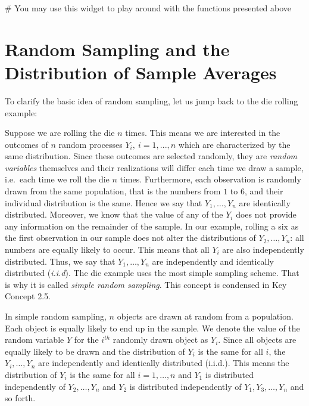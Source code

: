 \documentclass[]{book}
\theoremstyle{definition}
\theoremstyle{definition}
\theoremstyle{definition}
\theoremstyle{remark}
\begin{document}
 \# You may use this widget to play around with the functions presented
above

\section{Random Sampling and the Distribution of Sample
Averages}\label{RSATDOSA}

To clarify the basic idea of random sampling, let us jump back to the
die rolling example:

Suppose we are rolling the die \(n\) times. This means we are interested
in the outcomes of \(n\) random processes \(Y_i, \ i=1,...,n\) which are
characterized by the same distribution. Since these outcomes are
selected randomly, they are \emph{random variables} themselves and their
realizations will differ each time we draw a sample, i.e.~each time we
roll the die \(n\) times. Furthermore, each observation is randomly
drawn from the same population, that is the numbers from \(1\) to \(6\),
and their individual distribution is the same. Hence we say that
\(Y_1,\dots,Y_n\) are identically distributed. Moreover, we know that
the value of any of the \(Y_i\) does not provide any information on the
remainder of the sample. In our example, rolling a six as the first
observation in our sample does not alter the distributions of
\(Y_2,\dots,Y_n\): all numbers are equally likely to occur. This means
that all \(Y_i\) are also independently distributed. Thus, we say that
\(Y_1,\dots,Y_n\) are independently and identically distributed
(\emph{i.i.d}). The die example uses the most simple sampling scheme.
That is why it is called \emph{simple random sampling}. This concept is
condensed in Key Concept 2.5.

\begin{keyconcepts}{2.5}
In simple random sampling, $n$ objects are drawn at random from a population. Each object is equally likely to end up in the sample. We denote the value of the random variable $Y$ for the $i^{th}$ randomly drawn object as $Y_i$.  Since all objects are equally likely to be drawn and the distribution of $Y_i$ is the same for all $i$, the $Y_i, \dots, Y_n$ are independently and identically distributed (i.i.d.). This means the distribution of $Y_i$ is the same for all $i=1,\dots,n$ and $Y_1$ is distributed independently of $Y_2, \dots, Y_n$ and $Y_2$ is distributed independently of $Y_1, Y_3, \dots, Y_n$ and so forth.
\end{keyconcepts}
\end{document}
